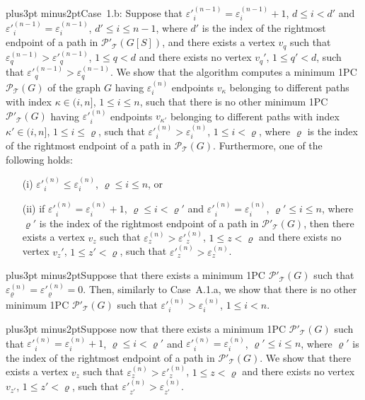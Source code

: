 \documentclass[10pt]{article}
\def\yskip{\penalty-50\vskip3pt plus3pt minus2pt}
\def\y{\yskip}
\begin{document}
{\y Case~1.b: Suppose that $\varepsilon'^{(n-1)}_i =
\varepsilon^{(n-1)}_i +1$, $d \leq i < d'$ and
$\varepsilon'^{(n-1)}_i = \varepsilon^{(n-1)}_i$, $d' \leq i \leq
n-1$, where $d'$ is the index of the rightmost endpoint of a path
in $\mathcal{P'_{\mathcal{T}}}(G[S])$, and there exists a vertex
$v_q$ such that $\varepsilon^{(n-1)}_q > \varepsilon'^{(n-1)}_q$,
$1 \leq q < d$ and there exists no vertex $v_q'$, $1 \leq q' <d$,
such that $\varepsilon'^{(n-1)}_q>\varepsilon^{(n-1)}_q$. We show
that the algorithm computes a minimum 1PC
$\mathcal{P_{\mathcal{T}}}(G)$ of the graph $G$ having
$\varepsilon^{(n)}_i$ endpoints $v_\kappa$ belonging to different
paths with index $\kappa \in (i,n]$, $1 \leq i \leq n$, such that
there is no other minimum 1PC $\mathcal{P'_{\mathcal{T}}}(G)$
having $\varepsilon'^{(n)}_i$ endpoints $v_{\kappa'}$ belonging to
different paths with index $\kappa' \in (i,n]$, $1 \leq i \leq
\varrho$, such that $\varepsilon'^{(n)}_i>\varepsilon^{(n)}_i$, $1
\leq i < \varrho$, where $\varrho$ is the index of the rightmost
endpoint of a path in $\mathcal{P_{\mathcal{T}}}(G)$. Furthermore,
one of the following holds:
\begin{itemize}
\item[(i)] $\varepsilon'^{(n)}_i \leq \varepsilon^{(n)}_i$,
$\varrho \leq i \leq n$, or \item[(ii)] if $\varepsilon'^{(n)}_i =
\varepsilon^{(n)}_i +1$, $\varrho \leq i < \varrho'$ and
$\varepsilon'^{(n)}_i = \varepsilon^{(n)}_i$, $\varrho' \leq i
\leq n$, where $\varrho'$ is the index of the rightmost endpoint
of a path in $\mathcal{P'_{\mathcal{T}}}(G)$, then there exists a
vertex $v_z$ such that $\varepsilon^{(n)}_z >
\varepsilon'^{(n)}_z$, $1 \leq z < \varrho$ and there exists no
vertex $v_z'$, $1 \leq z' <\varrho$, such that
$\varepsilon'^{(n)}_z>\varepsilon^{(n)}_z$.

\end{itemize}

\y Suppose that there exists a minimum 1PC
$\mathcal{P'_{\mathcal{T}}}(G)$ such that
$\varepsilon^{(n)}_\varrho = \varepsilon'^{(n)}_\varrho =0$. Then,
similarly to Case~A.1.a, we show that there is no other minimum
1PC $\mathcal{P'_{\mathcal{T}}}(G)$ such that
$\varepsilon'^{(n)}_i>\varepsilon^{(n)}_i$, $1 \leq i < n$.

\y Suppose now that there exists a minimum 1PC
$\mathcal{P'_{\mathcal{T}}}(G)$ such that $\varepsilon'^{(n)}_i =
\varepsilon^{(n)}_i +1$, $\varrho \leq i < \varrho'$ and
$\varepsilon'^{(n)}_i = \varepsilon^{(n)}_i$, $\varrho' \leq i
\leq n$, where $\varrho'$ is the index of the rightmost endpoint
of a path in $\mathcal{P'_{\mathcal{T}}}(G)$. We show that there
exists a vertex $v_z$ such that $\varepsilon^{(n)}_z >
\varepsilon'^{(n)}_z$, $1 \leq z < \varrho$ and there exists no
vertex $v_{z'}$, $1 \leq z' <\varrho$, such that
$\varepsilon'^{(n)}_{z'}>\varepsilon^{(n)}_{z'}$.

}
\end{document}
